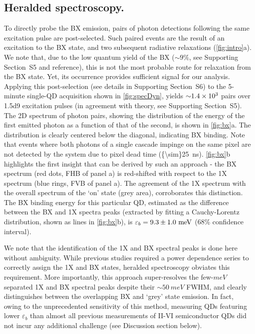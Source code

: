 \documentclass[journal=nalefd, manuscript=letter, layout=twocolumn]{achemso}
\newcommand{\supp}[1]{Supporting Section~S#1}
\begin{document}
\subsection*{Heralded spectroscopy.}
To directly probe the BX emission, pairs of photon detections following the same excitation pulse are post-selected. Such paired events are the result of an excitation to the BX state, and two subsequent radiative relaxations (\autoref{fig:intro}a). We note that, due to the low quantum yield of the BX (${\sim}9\%$, see \supp{5} and reference\cite{Lubin2019}), this is not the most probable route for relaxation from the BX state. Yet, its occurrence provides sufficient signal for our analysis. Applying this post-selection (see details in \supp{6}) to the 5-minute single-QD acquisition shown in \autoref{fig:specDyn}, yields ${\sim}\num{1.4d3}$ pairs over \num{1.5d9} excitation pulses (in agreement with theory, see \supp{5}). The 2D spectrum of photon pairs, showing the distribution of the energy of the first emitted photon as a function of that of the second, is shown in \autoref{fig:bx}a. The distribution is clearly centered below the diagonal, indicating BX binding. Note that events where both photons of a single cascade impinge on the same pixel are not detected by the system due to pixel dead time (\SI{{\sim}25}{ns}). \autoref{fig:bx}b highlights the first insight that can be derived by such an approach - the BX spectrum (red dots, FHB of panel a) is red-shifted with respect to the 1X spectrum (blue rings, FVB of panel a). The agreement of the 1X spectrum with the overall spectrum of the `on' state (grey area), corroborates this distinction. The BX binding energy for this particular QD, estimated as the difference between the BX and 1X spectra peaks (extracted by fitting a Cauchy-Lorentz distribution, shown as lines in \autoref{fig:bx}b), is $\varepsilon_b=\num{9.3+-1.0}~\si{meV}$ (68\% confidence interval).

We note that the identification of the 1X and BX spectral peaks is done here without ambiguity. While previous studies required a power dependence series to correctly assign the 1X and BX states\cite{Dekel2000,Oron2006}, heralded spectroscopy obviates this requirement. 
More importantly, this approach super-resolves the few-$\si{meV}$ separated 1X and BX spectral peaks despite their ${\sim}\SI{50}{meV}$ FWHM, and clearly distinguishes between the overlapping BX and `grey' state emission. In fact, owing to the unprecedented sensitivity of this method, measuring QDs featuring lower $\varepsilon_b$ than almost all previous measurements of II-VI semiconductor QDs did not incur any additional challenge (see Discussion section below). 
\end{document}
